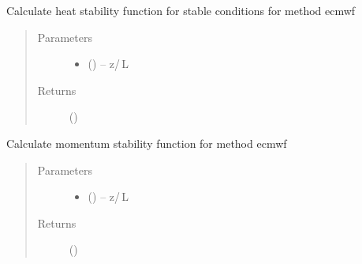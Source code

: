 \documentclass[letterpaper,10pt,english]{sphinxmanual}
\begin{document}

\begin{fulllineitems}
\label{\detokenize{index:flux_subs.psi_ecmwf}}
Calculate heat stability function for stable conditions for method ecmwf \citep{era5_2019}
\begin{quote}\begin{description}
\item[{Parameters}] \leavevmode\begin{itemize}
\item {} 
 (\href{https://docs.python.org/3/library/functions.html\#float}{}) -- z\slash\,L

\end{itemize}

\item[{Returns}] \leavevmode
{} (\href{https://docs.python.org/3/library/functions.html\#float}{})

\end{description}\end{quote}

\end{fulllineitems}


\begin{fulllineitems}
\label{\detokenize{index:flux_subs.psim_ecmwf}}
Calculate momentum stability function for method ecmwf  \citep{era5_2019}

\begin{quote}\begin{description}
\item[{Parameters}] \leavevmode\begin{itemize}
\item {} 
 (\href{https://docs.python.org/3/library/functions.html\#float}{}) -- z\slash\,L
\end{itemize}

\item[{Returns}] \leavevmode
{} (\href{https://docs.python.org/3/library/functions.html\#float}{})

\end{description}\end{quote}

\end{fulllineitems}
\end{document}

